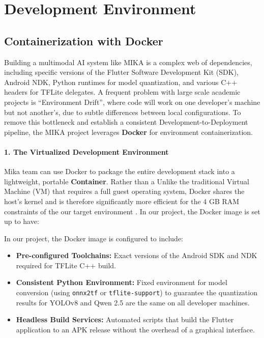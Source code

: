 \documentclass[12pt,a4paper]{report}
\begin{document}
\section{Development Environment}
 
\subsection{Containerization with Docker}
 
Building a multimodal AI system like MIKA is a complex web of dependencies, including specific versions of the Flutter Software Development Kit (SDK), Android NDK, Python runtimes for model quantization, and various C++ headers for TFLite delegates. A frequent problem with large scale academic projects is “Environment Drift”, where code will work on one developer’s machine but not another’s, due to subtle differences between local configurations. To remove this bottleneck and establish a consistent Development-to-Deployment pipeline, the MIKA project leverages \textbf{Docker} for environment containerization.

\paragraph{1. The Virtualized Development Environment}
Mika team can use Docker to package the entire development stack into a lightweight, portable \textbf{Container}. Rather than a Unlike the traditional Virtual Machine (VM) that requires a full guest operating system, Docker shares the host’s kernel and is therefore significantly more efficient for the 4 GB RAM constraints of the our target environment .
In our project, the Docker image is set up to have:

In our project, the Docker image is configured to include:
\begin{itemize}
    \item \textbf{Pre-configured Toolchains:} Exact versions of the Android SDK and NDK required for TFLite C++ build.
    \item \textbf{Consistent Python Environment:} Fixed environment for model conversion (using \texttt{onnx2tf} or \texttt{tflite-support}) to guarantee the quantization results for YOLOv8 and Qwen 2.5 are the same on all developer machines.
    \item \textbf{Headless Build Services:} Automated scripts that build the Flutter application to an APK release without the overhead of a graphical interface.
\end{itemize}
 
\end{document}
